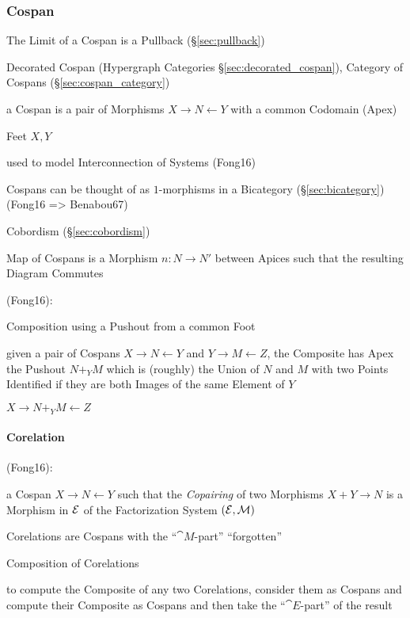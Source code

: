 \subsubsection{Cospan}\label{sec:cospan}

The Limit of a Cospan is a Pullback (\S\ref{sec:pullback})

\fist Decorated Cospan (Hypergraph Categories
\S\ref{sec:decorated_cospan}), Category of Cospans
(\S\ref{sec:cospan_category})

a Cospan is a pair of Morphisms $X \rightarrow N \leftarrow Y$ with a
common Codomain (Apex)

Feet $X,Y$

used to model Interconnection of Systems (Fong16)

Cospans can be thought of as $1$-morphisms in a Bicategory
(\S\ref{sec:bicategory}) (Fong16 => Benabou67)

Cobordism (\S\ref{sec:cobordism})

Map of Cospans is a Morphism $n : N \rightarrow N'$ between Apices
such that the resulting Diagram Commutes

(Fong16):

Composition using a Pushout from a common Foot

given a pair of Cospans $X \rightarrow N \leftarrow Y$ and $Y
\rightarrow M \leftarrow Z$, the Composite has Apex the Pushout $N +_Y
M$ which is (roughly) the Union of $N$ and $M$ with two Points
Identified if they are both Images of the same Element of $Y$

$X \rightarrow N +_Y M \leftarrow Z$



\paragraph{Corelation}\label{sec:corelation}\hfill

(Fong16):

a Cospan $X \rightarrow N \leftarrow Y$ such that the \emph{Copairing}
of two Morphisms $X + Y \rightarrow N$ is a Morphism in $\mathcal{E}$ of
the Factorization System $(\mathcal{E}, \mathcal{M})$ %

Corelations are Cospans with the ``$\cat{M}$-part'' ``forgotten''

Composition of Corelations

to compute the Composite of any two Corelations, consider them as
Cospans and compute their Composite as Cospans and then take the
``$\cat{E}$-part'' of the result %

